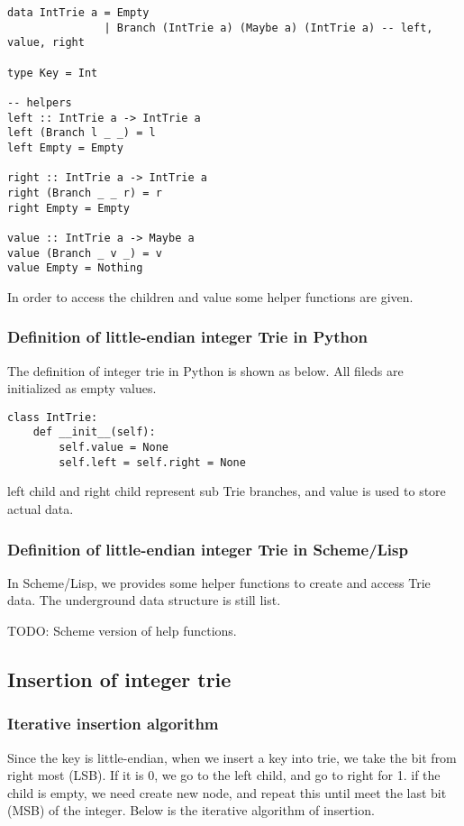 \documentclass{article}
\begin{document}
\lstset{language=Haskell}
\begin{lstlisting}
data IntTrie a = Empty 
               | Branch (IntTrie a) (Maybe a) (IntTrie a) -- left, value, right

type Key = Int

-- helpers
left :: IntTrie a -> IntTrie a
left (Branch l _ _) = l
left Empty = Empty

right :: IntTrie a -> IntTrie a
right (Branch _ _ r) = r
right Empty = Empty

value :: IntTrie a -> Maybe a
value (Branch _ v _) = v
value Empty = Nothing
\end{lstlisting}

In order to access the children and value some helper functions are given.

\subsubsection*{Definition of little-endian integer Trie in Python}
The definition of integer trie in Python is shown as below. All fileds
are initialized as empty values.

\lstset{language=Python}
\begin{lstlisting}
class IntTrie:
    def __init__(self):
        self.value = None
        self.left = self.right = None
\end{lstlisting}

left child and right child represent sub Trie branches, and value is used to 
store actual data.

\subsubsection*{Definition of little-endian integer Trie in Scheme/Lisp}
In Scheme/Lisp, we provides some helper functions to create and access 
Trie data. The underground data structure is still list.

TODO: Scheme version of help functions.

\subsection{Insertion of integer trie}

\subsubsection{Iterative insertion algorithm}
Since the key is little-endian, when we insert a key into trie, we take the
bit from right most (LSB). If it is 0, we go to the left child, and go to right
for 1. if the child is empty, we need create new node, and repeat this until
meet the last bit (MSB) of the integer. Below is the iterative algorithm
of insertion.
\end{document}
